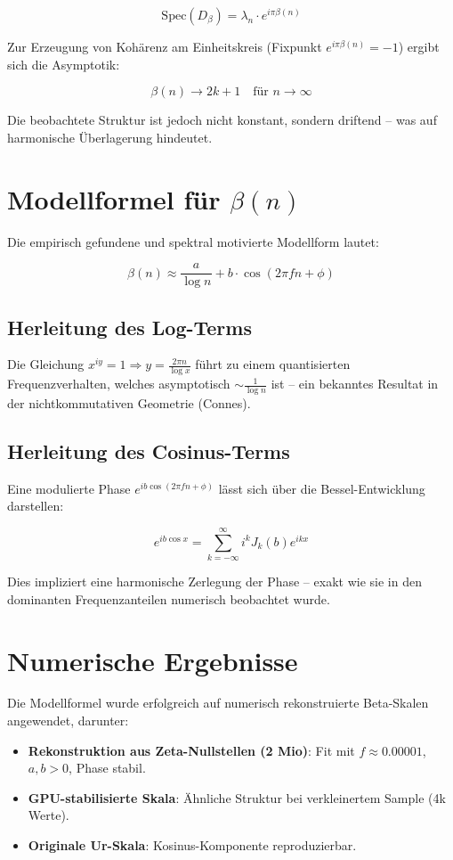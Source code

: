 \documentclass[11pt]{article}
\begin{document}
\[
\text{Spec}(D_\beta) = \lambda_n \cdot e^{i\pi \beta(n)}
\]

Zur Erzeugung von Kohärenz am Einheitskreis (Fixpunkt \(e^{i\pi \beta(n)} = -1\)) ergibt sich die Asymptotik:

\[
\beta(n) \rightarrow 2k + 1 \quad \text{für } n \rightarrow \infty
\]

Die beobachtete Struktur ist jedoch nicht konstant, sondern driftend – was auf harmonische Überlagerung hindeutet.

\section{Modellformel für \texorpdfstring{\(\beta(n)\)}{beta(n)}}
Die empirisch gefundene und spektral motivierte Modellform lautet:

\[
\beta(n) \approx \frac{a}{\log n} + b \cdot \cos(2\pi f n + \phi)
\]

\subsection*{Herleitung des Log-Terms}
Die Gleichung \( x^{iy} = 1 \Rightarrow y = \frac{2\pi n}{\log x} \) führt zu einem quantisierten Frequenzverhalten, welches asymptotisch \( \sim \frac{1}{\log n} \) ist – ein bekanntes Resultat in der nichtkommutativen Geometrie (Connes).

\subsection*{Herleitung des Cosinus-Terms}
Eine modulierte Phase \( e^{i b \cos(2\pi f n + \phi)} \) lässt sich über die Bessel-Entwicklung darstellen:

\[
e^{i b \cos x} = \sum_{k=-\infty}^{\infty} i^k J_k(b) e^{ikx}
\]

Dies impliziert eine harmonische Zerlegung der Phase – exakt wie sie in den dominanten Frequenzanteilen numerisch beobachtet wurde.

\section{Numerische Ergebnisse}
Die Modellformel wurde erfolgreich auf numerisch rekonstruierte Beta-Skalen angewendet, darunter:
\begin{itemize}
  \item \textbf{Rekonstruktion aus Zeta-Nullstellen (2 Mio)}: Fit mit \(f \approx 0.00001\), \(a, b > 0\), Phase stabil.
  \item \textbf{GPU-stabilisierte Skala}: Ähnliche Struktur bei verkleinertem Sample (4k Werte).
  \item \textbf{Originale Ur-Skala}: Kosinus-Komponente reproduzierbar.
\end{itemize}
\end{document}
